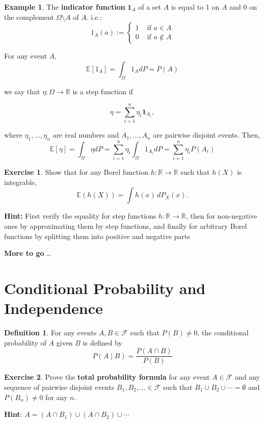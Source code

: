 \documentclass[
]{book}
\theoremstyle{definition}
\newtheorem{definition}{Definition}[chapter]
\theoremstyle{definition}
\newtheorem{example}{Example}[chapter]
\theoremstyle{definition}
\newtheorem{exercise}{Exercise}[chapter]
\theoremstyle{definition}
\theoremstyle{remark}
\begin{document}
\begin{example}
\protect\hypertarget{exm:unnamed-chunk-26}{}\label{exm:unnamed-chunk-26}The \textbf{indicator function} \(\mathbf{1}_A\) of a set \(A\) is equal to 1 on \(A\) and 0 on the complement \(\Omega \setminus A\) of \(A\).
i.e.:
\[1_A(a):=\begin{cases} 1 & \text{ if } a \in A  \\0 & \text{ if } a \not\in A\end{cases}  \]

For any event \(A\),
\[\mathbb{E}[1_A]=\int_\Omega 1_A dP=P(A)\]

we say that \(\eta : \Omega \to \mathbb{R}\) is a step function if

\[ \eta = \sum_{i=1}^n \eta_i \mathbf{1}_{A_i}, \]

where \(\eta_1, \ldots, \eta_n\) are real numbers and \(A_1, \ldots, A_n\) are pairwise disjoint events. Then,
\[\mathbb{E}[\eta]=\int_\Omega \eta dP=\sum_{i=1}^n\eta_i \int_\Omega 1_{A_i} dP=\sum_{i=1}^n \eta_i P(A_i)\]
\end{example}

\begin{exercise}
\protect\hypertarget{exr:unnamed-chunk-27}{}\label{exr:unnamed-chunk-27}Show that for any Borel function \(h : \mathbb{R} \to \mathbb{R}\) such that \(h(X)\) is integrable,
\[ \mathbb{E}(h(X)) = \int h(x) \, dP_X(x). \]

\textbf{Hint:} First verify the equality for step functions \(h : \mathbb{R} \to \mathbb{R}\), then for non-negative ones by approximating them by step functions, and finally for arbitrary Borel functions by splitting them into positive and negative parts
\end{exercise}

\textbf{More to go}
\ldots{}

\section{Conditional Probability and Independence}\label{conditional-probability-and-independence}

\begin{definition}
\protect\hypertarget{def:unnamed-chunk-28}{}\label{def:unnamed-chunk-28}For any events \(A, B \in \mathcal{F}\) such that \(P(B) \neq 0\), the conditional probability of \(A\) given \(B\) is defined by
\[P(A \mid B) = \frac{P(A \cap B)}{P(B)}\]
\end{definition}

\begin{exercise}
\protect\hypertarget{exr:unnamed-chunk-29}{}\label{exr:unnamed-chunk-29}Prove the \textbf{total probability formula} for any event \(A \in \mathcal{F}\) and any sequence of pairwise disjoint events \(B_1, B_2, \ldots \in \mathcal{F}\) such that \(B_1 \cup B_2 \cup \cdots = \emptyset\) and \(P(B_n) \neq 0\) for any \(n\).

\textbf{Hint}: \(A = (A \cap B_1) \cup (A \cap B_2) \cup \cdots\)
\end{exercise}
\end{document}
